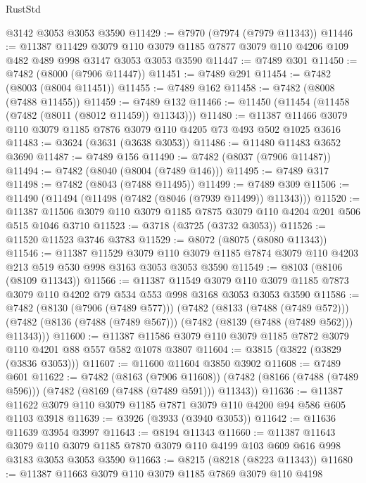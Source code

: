 \begin{lexlean}{RustStd}
\begin{coremodule}
{\begin{coremodule}
{{{{{{{{{{{{{{{{{{{{{{{{{{{{{{{{    @3142
    @3053
    @3053
    @3590
@11429 := @7970 (@7974 (@7979 @11343))
@11446 := @11387
    @11429
    @3079
    @110
    @3079
    @1185
    @7877
    @3079
    @110
    @4206
    @109
    @482
    @489
    @998
    @3147
    @3053
    @3053
    @3590
@11447 := @7489 @301
@11450 := @7482 (@8000 (@7906 @11447))
@11451 := @7489 @291
@11454 := @7482 (@8003 (@8004 @11451))
@11455 := @7489 @162
@11458 := @7482 (@8008 (@7488 @11455))
@11459 := @7489 @132
@11466 := @11450 (@11454 (@11458 (@7482 (@8011 (@8012 @11459)) @11343)))
@11480 := @11387 @11466 @3079 @110 @3079 @1185 @7876 @3079 @110 @4205 @73 @493 @502 @1025 @3616
@11483 := @3624 (@3631 (@3638 @3053))
@11486 := @11480 @11483 @3652 @3690
@11487 := @7489 @156
@11490 := @7482 (@8037 (@7906 @11487))
@11494 := @7482 (@8040 (@8004 (@7489 @146)))
@11495 := @7489 @317
@11498 := @7482 (@8043 (@7488 @11495))
@11499 := @7489 @309
@11506 := @11490 (@11494 (@11498 (@7482 (@8046 (@7939 @11499)) @11343)))
@11520 := @11387 @11506 @3079 @110 @3079 @1185 @7875 @3079 @110 @4204 @201 @506 @515 @1046 @3710
@11523 := @3718 (@3725 (@3732 @3053))
@11526 := @11520 @11523 @3746 @3783
@11529 := @8072 (@8075 (@8080 @11343))
@11546 := @11387
    @11529
    @3079
    @110
    @3079
    @1185
    @7874
    @3079
    @110
    @4203
    @213
    @519
    @530
    @998
    @3163
    @3053
    @3053
    @3590
@11549 := @8103 (@8106 (@8109 @11343))
@11566 := @11387
    @11549
    @3079
    @110
    @3079
    @1185
    @7873
    @3079
    @110
    @4202
    @79
    @534
    @553
    @998
    @3168
    @3053
    @3053
    @3590
@11586 := @7482
    (@8130 (@7906 (@7489 @577)))
    (@7482
      (@8133 (@7488 (@7489 @572)))
      (@7482 (@8136 (@7488 (@7489 @567))) (@7482 (@8139 (@7488 (@7489 @562))) @11343)))
@11600 := @11387 @11586 @3079 @110 @3079 @1185 @7872 @3079 @110 @4201 @88 @557 @582 @1078 @3807
@11604 := @3815 (@3822 (@3829 (@3836 @3053)))
@11607 := @11600 @11604 @3850 @3902
@11608 := @7489 @601
@11622 := @7482
    (@8163 (@7906 @11608))
    (@7482 (@8166 (@7488 (@7489 @596))) (@7482 (@8169 (@7488 (@7489 @591))) @11343))
@11636 := @11387 @11622 @3079 @110 @3079 @1185 @7871 @3079 @110 @4200 @94 @586 @605 @1103 @3918
@11639 := @3926 (@3933 (@3940 @3053))
@11642 := @11636 @11639 @3954 @3997
@11643 := @8194 @11343
@11660 := @11387
    @11643
    @3079
    @110
    @3079
    @1185
    @7870
    @3079
    @110
    @4199
    @103
    @609
    @616
    @998
    @3183
    @3053
    @3053
    @3590
@11663 := @8215 (@8218 (@8223 @11343))
@11680 := @11387
    @11663
    @3079
    @110
    @3079
    @1185
    @7869
    @3079
    @110
    @4198
}}}}}}}}}}}}}}}}}}}}}}}}}}}}}}}}
\end{coremodule}}
\end{coremodule}
\end{lexlean}

